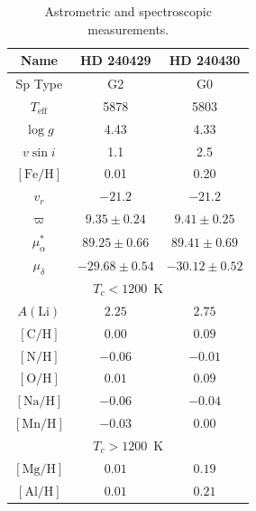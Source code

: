 \documentclass[manuscript]{aastex6}
\newcommand*\elem[1]{\ensuremath{\mathrm{#1}}}
\newcommand*\elemH[1]{\ensuremath{[\mathrm{#1}/\elem{H}]}}
\begin{document}
\begin{table}[htpb]
  \caption{Astrometric and spectroscopic measurements.}
  \label{tab:t2}
  \begin{threeparttable}
  \centering
  \begin{tabular}{ccc}
\hline\hline
Name & HD 240429 & HD 240430 \\
\hline
Sp Type                                   & G2                & G0                \\
$T_\mathrm{eff}$                          & 5878              & 5803              \\
$\log{g}$                                 & 4.43              & 4.33              \\
$v\sin{i}$                                & 1.1               & 2.5               \\
$[\elem{Fe}/\elem{H}]$                    & 0.01              & 0.20              \\
$v_r$                                     & $-21.2$           & $-21.2$           \\
$\varpi$ \footnotemark[1]                 & $9.35 \pm 0.24$   & $9.41 \pm 0.25$   \\
$\mu_\alpha^*$ \footnotemark[1]           & $89.25 \pm 0.66$  & $89.41 \pm 0.69$  \\
$\mu_\delta$ \footnotemark[1]             & $-29.68 \pm 0.54$ & $-30.12 \pm 0.52$ \\
\hline
\multicolumn{3}{c}{$T_c < 1200$~K} \\
\hline
$A(\elem{Li})$ \footnotemark[2]           & $2.25$            & $2.75$            \\
$\elemH{C}$                               & $0.00$            & $0.09$            \\
$\elemH{N}$                               & $-0.06$           & $-0.01$           \\
$\elemH{O}$                               & $0.01$            & $0.09$            \\
$\elemH{Na}$                              & $-0.06$           & $-0.04$           \\
$\elemH{Mn}$                              & $-0.03$           & $0.00$            \\
\hline
\multicolumn{3}{c}{$T_c > 1200$~K} \\
\hline
$\elemH{Mg}$                              & $0.01$            & $0.19$            \\
$\elemH{Al}$                              & $0.01$            & $0.21$            \\

\end{tabular}
\end{threeparttable}
\end{table}
\end{document}
